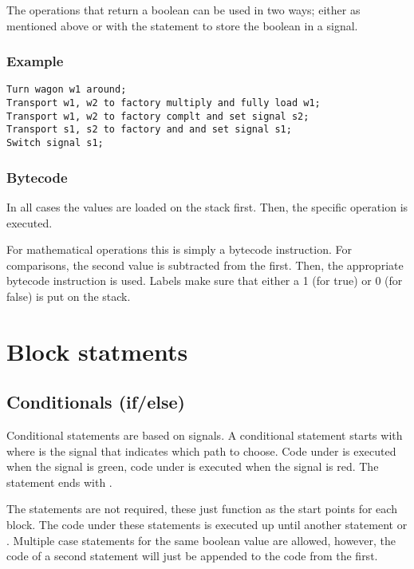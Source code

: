 The operations that return a boolean can be used in two ways; either as mentioned above or with the statement  to store the boolean in a signal.

\subsubsection*{Example}

\begin{lstlisting}
Turn wagon w1 around;
Transport w1, w2 to factory multiply and fully load w1;
Transport w1, w2 to factory complt and set signal s2;
Transport s1, s2 to factory and and set signal s1;
Switch signal s1;
\end{lstlisting}

\subsubsection*{Bytecode}

In all cases the values are loaded on the stack first. Then, the specific operation is executed.

For mathematical operations this is simply a bytecode instruction. For comparisons, the second value is subtracted from the first. Then, the appropriate bytecode instruction is used. Labels make sure that either a 1 (for true) or 0 (for false) is put on the stack.

\section{Block statments}

\subsection{Conditionals (if/else)}

Conditional statements are based on signals. A conditional statement starts with  where  is the signal that indicates which path to choose. Code under  is executed when the signal is green, code under  is executed when the signal is red. The statement ends with .

The  statements are not required, these just function as the start points for each block. The code under these statements is executed up until another  statement or . Multiple case statements for the same boolean value are allowed, however, the code of a second statement will just be appended to the code from the first.

